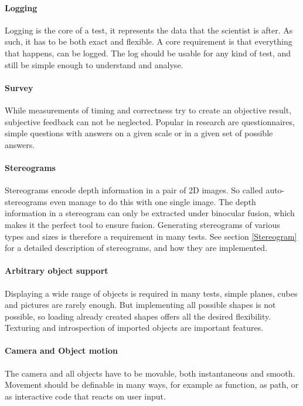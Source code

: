 \paragraph{Logging}
Logging is the core of a test, it represents the data that the scientist is after.
As such, it has to be both exact and flexible.
A core requirement is that everything that happens, can be logged.
The log should be usable for any kind of test, and still be simple enough to understand and analyse.

\paragraph{Survey}
While measurements of timing and correctness try to create an objective result, subjective feedback can not be neglected.
Popular in research are questionnaires, simple questions with answers on a given scale or in a given set of possible answers.

\paragraph{Stereograms}
Stereograms encode depth information in a pair of 2D images.
So called auto-stereograms even manage to do this with one single image.
The depth information in a stereogram can only be extracted under binocular fusion, which makes it the perfect tool to ensure fusion.
Generating stereograms of various types and sizes is therefore a requirement in many tests.
See section \ref{Stereogram} for a detailed description of stereograms, and how they are implemented.

\paragraph{Arbitrary object support}
Displaying a wide range of objects is required in many tests, simple planes, cubes and pictures are rarely enough.
But implementing all possible shapes is not possible, so loading already created shapes offers all the desired flexibility.
Texturing and introspection of imported objects are important features.

\paragraph{Camera and Object motion}
The camera and all objects have to be movable, both instantaneous and smooth.
Movement should be definable in many ways, for example as function, as path, or as interactive code that reacts on user input.

